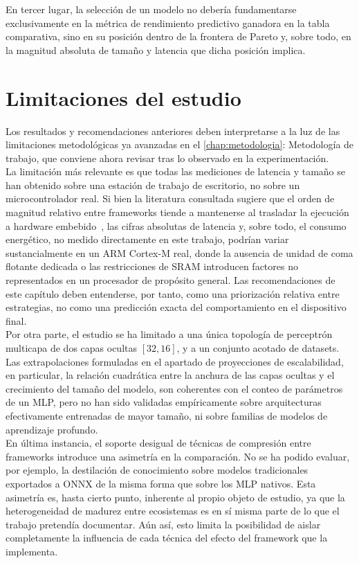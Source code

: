 \documentclass[a4paper,12pt,twoside,final]{book}
\begin{document}
En tercer lugar, la selección de un modelo no debería fundamentarse exclusivamente en la métrica de rendimiento
predictivo ganadora en la tabla comparativa, sino en su posición dentro de la frontera de Pareto y, sobre todo, en la
magnitud absoluta de tamaño y latencia que dicha posición implica.
 
\section{Limitaciones del estudio}
Los resultados y recomendaciones anteriores deben interpretarse a la luz de las limitaciones metodológicas ya
avanzadas en el \autoref{chap:metodologia}: Metodología de trabajo, que conviene ahora revisar tras lo observado en la
experimentación.\\
 
La limitación más relevante es que todas las mediciones de latencia y tamaño se han obtenido sobre una estación de
trabajo de escritorio, no sobre un microcontrolador real. Si bien la literatura consultada sugiere que el orden de
magnitud relativo entre frameworks tiende a mantenerse al trasladar la ejecución a hardware
embebido~\cite{lin2023ieeemcas}, las cifras absolutas de latencia y, sobre todo, el consumo energético, no medido
directamente en este trabajo, podrían variar sustancialmente en un ARM Cortex-M real, donde la ausencia de unidad de
coma flotante dedicada o las restricciones de SRAM introducen factores no representados en un procesador de propósito
general. Las recomendaciones de este capítulo deben entenderse, por tanto, como una priorización relativa entre
estrategias, no como una predicción exacta del comportamiento en el dispositivo final.\\
 
Por otra parte, el estudio se ha limitado a una única topología de perceptrón multicapa de dos capas ocultas
$[32, 16]$, y a un conjunto acotado de datasets. Las extrapolaciones formuladas en el apartado de proyecciones de
escalabilidad, en particular, la relación cuadrática entre la anchura de las capas ocultas y el crecimiento del tamaño
del modelo, son coherentes con el conteo de parámetros de un MLP, pero no han sido validadas empíricamente sobre
arquitecturas efectivamente entrenadas de mayor tamaño, ni sobre familias de modelos de aprendizaje profundo.\\
 
En última instancia, el soporte desigual de técnicas de compresión entre frameworks introduce una asimetría en la
comparación. No se ha podido evaluar, por ejemplo, la destilación de conocimiento sobre modelos tradicionales exportados
a ONNX de la misma forma que sobre los MLP nativos. Esta asimetría es, hasta cierto punto, inherente al propio objeto
de estudio, ya que la heterogeneidad de madurez entre ecosistemas es en sí misma parte de lo que el trabajo pretendía
documentar. Aún así, esto limita la posibilidad de aislar completamente la influencia de cada técnica del efecto del
framework que la implementa.\\
 
\end{document}
